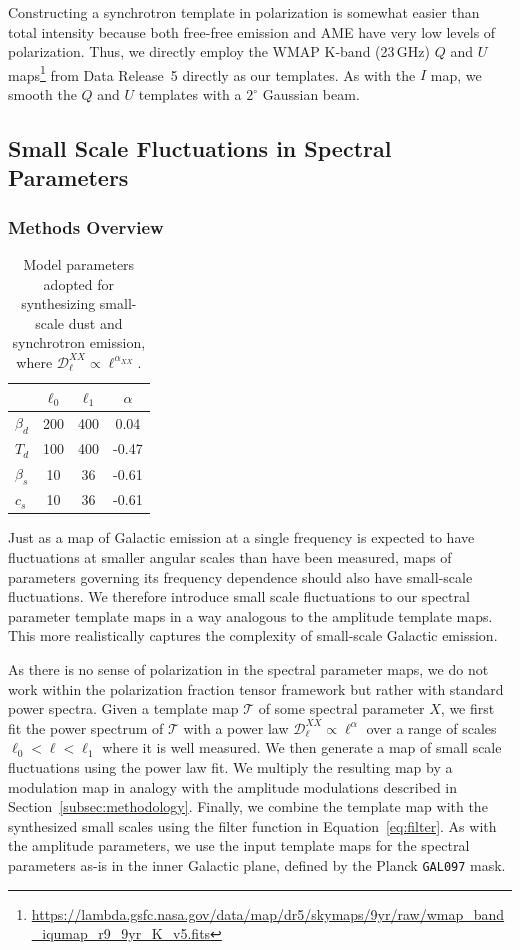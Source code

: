 \documentclass[twocolumn]{aastex631}
\begin{document}
Constructing a synchrotron template in polarization is somewhat easier than total intensity because both free-free emission and AME have very low levels of polarization. Thus, we directly employ the WMAP K-band (23\,GHz) $Q$ and $U$ maps\footnote{\url{https://lambda.gsfc.nasa.gov/data/map/dr5/skymaps/9yr/raw/wmap_band_iqumap_r9_9yr_K_v5.fits}} from Data Release~5 directly as our templates. As with the $I$ map, we smooth the $Q$ and $U$ templates with a $2^\circ$ Gaussian beam.

\subsection{Small Scale Fluctuations in Spectral Parameters} \label{sec:spec_params}

\subsubsection{Methods Overview}
\begin{table}
    \centering
    \begin{tabular}{lccc}
    \toprule 
   & $\ell_0$ & $\ell_1$ & $\alpha$  \\
   \midrule  
   $\beta_d$ & 200 & 400 & 0.04 \\ 
   $T_d$ & 100 & 400  & -0.47\\
    \midrule 
    $\beta_s$ & 10 & 36 & -0.61\\
    $c_s$ & 10 & 36 & -0.61  \\ 
   \bottomrule
    \end{tabular}
    \caption{Model parameters adopted for synthesizing small-scale dust and synchrotron emission, where $\mathcal{D}_\ell^{XX} \propto \ell^{\alpha_{XX}}$.}
    \label{tab:smallscale_specpar}
\end{table}

Just as a map of Galactic emission at a single frequency is expected to have fluctuations at smaller angular scales than have been measured, maps of parameters governing its frequency dependence should also have small-scale fluctuations. We therefore introduce small scale fluctuations to our spectral parameter template maps in a way analogous to the amplitude template maps. This more realistically captures the complexity of small-scale Galactic emission.

As there is no sense of polarization in the spectral parameter maps, we do not work within the polarization fraction tensor framework but rather with standard power spectra. Given a template map $\mathcal{T}$ of some spectral parameter $X$, we first fit the power spectrum of $\mathcal{T}$ with a power law $\mathcal{D}_\ell^{XX} \propto \ell^\alpha$ over a range of scales $\ell_0 < \ell < \ell_1$ where it is well measured. We then generate a map of small scale fluctuations using the power law fit. We multiply the resulting map by a modulation map in analogy with the amplitude modulations described in Section~\ref{subsec:methodology}. Finally, we combine the template map with the synthesized small scales using the filter function in Equation~\ref{eq:filter}. As with the amplitude parameters, we use the input template maps for the spectral parameters as-is in the inner Galactic plane, defined by the Planck \texttt{GAL097} mask.
\end{document}
